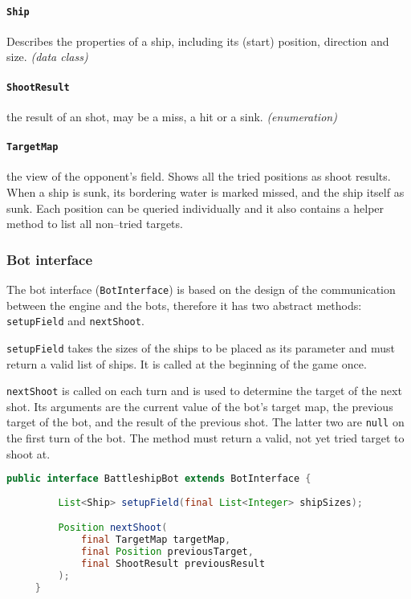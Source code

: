 \documentclass[11pt,a4paper,oneside]{report}
\newcommand{\code}{\texttt}
\begin{document}
				\paragraph{\code{Ship}} Describes the properties of a ship, including its (start) position, direction and size. \emph{(data class)}
				
				\paragraph{\code{ShootResult}} the result of an shot, may be a miss, a hit or a sink. \emph{(enumeration)}
				
				\paragraph{\code{TargetMap}} the view of the opponent's field. Shows all the tried positions as shoot results. When a ship is sunk, its bordering water is marked missed, and the ship itself as sunk. Each position can be queried individually and it also contains a helper method to list all non--tried targets.
			
		
			\subsubsection{Bot interface}
			
			The bot interface (\code{BotInterface}) is based on the design of the communication between the engine and the bots, therefore it has two abstract methods: \code{setupField} and \code{nextShoot}.

			\code{setupField} takes the sizes of the ships to be placed as its parameter and must return a valid list of ships. It is called at the beginning of the game once.
			
			\code{nextShoot} is called on each turn and is used to determine the target of the next shot. Its arguments are the current value of the bot's target map, the previous target of the bot, and the result of the previous shot. The latter two are \code{null} on the first turn of the bot. The method must return a valid, not yet tried target to shoot at.
		
			\begin{center}
				\begin{minipage}{12cm}
		\begin{lstlisting}[language=Java, title={\code{BattleshipBot.java}}]
	 public interface BattleshipBot extends BotInterface {
	    
	     List<Ship> setupField(final List<Integer> shipSizes);

	 	 Position nextShoot(
	 		 final TargetMap targetMap,
			 final Position previousTarget,
    		 final ShootResult previousResult
		 );
	 }
		\end{lstlisting}
				\end{minipage}
			\end{center}
		
\end{document}
